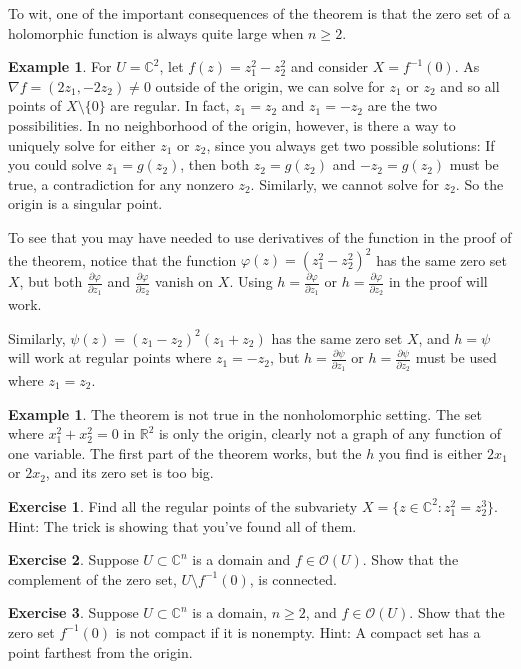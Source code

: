 \documentclass[12pt,openany]{book}
\newcommand{\C}{{\mathbb{C}}}
\newcommand{\R}{{\mathbb{R}}}
\newcommand{\sO}{{\mathscr{O}}}
\theoremstyle{plain}
\theoremstyle{remark}
\theoremstyle{definition}
\newenvironment{exbox}{%
    \def\FrameCommand{\vrule width 1pt \relax\hspace{10pt}}%
    \MakeFramed{\advance\hsize-\width\FrameRestore}%
}{%
    \endMakeFramed
}
\theoremstyle{exercise}
\newtheorem{exercise}{Exercise}[section]
\theoremstyle{example}
\newtheorem{example}[thm]{Example}
\begin{document}
To wit, one of the important consequences of the theorem is that the zero set of
a holomorphic function is always quite large when $n \geq 2$.

\begin{example}
For $U = \C^2$,
let $f(z) = z_1^2-z_2^2$ and consider $X = f^{-1}(0)$. As $\nabla f =
(2z_1,-2z_2) \neq 0$
outside of the origin, we can solve for $z_1$ or $z_2$ and so
all points of $X \setminus \{ 0 \}$ are regular.  In fact,
$z_1 = z_2$ and $z_1 = -z_2$ are the two possibilities.
In no neighborhood of the origin, however, is there a way to uniquely solve for either
$z_1$ or $z_2$, since you always get two possible solutions:  If you could
solve $z_1 = g(z_2)$, then both $z_2 = g(z_2)$ and $-z_2 = g(z_2)$ must be
true, a contradiction for any nonzero $z_2$.  Similarly,
we cannot solve for $z_2$.
So the origin is a singular point.

To see that you may have needed to use derivatives of the function in the
proof of the theorem,
notice
that the function $\varphi(z) = {(z_1^2-z_2^2)}^2$ has the same zero set $X$,
but both
$\frac{\partial \varphi}{\partial z_1}$ and
$\frac{\partial \varphi}{\partial z_2}$ vanish on $X$.  Using
$h= \frac{\partial \varphi}{\partial z_1}$ or
$h= \frac{\partial \varphi}{\partial z_2}$ in the proof will work.

Similarly, $\psi(z) = {(z_1-z_2)}^2 (z_1+z_2)$ has the same
zero set $X$, and $h=\psi$ will work at regular points where $z_1 = -z_2$,
but $h = \frac{\partial \psi}{\partial z_1}$ or
$h = \frac{\partial \psi}{\partial z_2}$ must be used where $z_1 = z_2$.
\end{example}

\begin{example}
\pagebreak[2]
The theorem is not true in the nonholomorphic setting.  The set
where $x_1^2 +  x_2^2 = 0$ in $\R^2$ is only the origin, clearly not a graph
of any function of one variable.  The first part of the theorem works, but
the $h$ you find is either $2x_1$ or $2x_2$, and its zero set is too big.
\end{example}

\begin{exbox}
\begin{exercise}
Find all the regular points of the subvariety
$X = \bigl\{ z \in \C^2 : z_1^2 = z_2^3 \bigr\}$.
Hint: The trick is showing that you've found all of them.
\end{exercise}

\begin{exercise} \label{exercise:connectedcomplement}
Suppose $U \subset \C^n$ is a domain and $f \in \sO(U)$.
Show that the complement of the zero set, $U \setminus f^{-1}(0)$, is
connected.
\end{exercise}

\begin{exercise} \label{exercise:zerosetnotcompact}
Suppose $U \subset \C^n$ is a domain, $n \geq 2$, and $f \in \sO(U)$.
Show that the zero set $f^{-1}(0)$ is not compact if it is nonempty.
Hint: A compact set has a point farthest from the origin.
\end{exercise}
\end{exbox}
\end{document}
